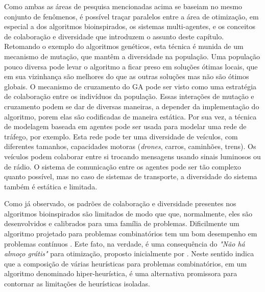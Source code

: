 Como ambas as áreas de pesquisa mencionadas acima se baseiam no mesmo conjunto de fenômenos, é possível traçar paralelos entre a área de otimização, em especial a dos algoritmos bioinspirados, os sistemas multi-agentes, e os conceitos de colaboração e diversidade que introduzem o assunto deste capítulo. Retomando o exemplo do algoritmos genéticos, esta técnica é munida de um mecanismo de mutação, que mantêm a diversidade na população. Uma população pouco diversa pode levar o algoritmo a ficar preso em soluções ótimas locais, que em sua vizinhança são melhores do que as outras soluções mas não são ótimos globais. O mecanismo de cruzamento do GA pode ser visto como uma estratégia de colaboração entre os indivíduos da população. Essas interações de mutação e cruzamento podem se dar de diversas maneiras, a depender da implementação do algoritmo, porem elas são codificadas de maneira estática. Por sua vez, a técnica de modelagem baseada em agentes pode ser usada para modelar uma rede de tráfego, por exemplo. Esta rede pode ter uma diversidade de veículos, com diferentes tamanhos, capacidades motoras (\textit{drones}, carros, caminhões, trens). Os veículos podem colaborar entre si trocando mensagens usando sinais luminosos ou de rádio. O sistema de comunicação entre os agentes pode ser tão complexo quanto possível, mas no caso de sistemas de transporte, a diversidade do sistema também é estática e limitada.

Como já observado, os padrões de colaboração e diversidade presentes nos algoritmos bioinspirados são limitados de modo que que, normalmente, eles são desenvolvidos e calibrados para uma família de problemas. Dificilmente um algoritmo projetado para problemas combinatórios tem um bom desempenho em problemas contínuos \cite{burke2003}. Este fato, na verdade, é uma consequência do \textit{"Não há almoço grátis"} para otimização, proposto inicialmente por . Neste sentido  indica que a composição de várias heurísticas para problemas combinatórios, em um algoritmo denominado hiper-heurística, é uma alternativa promissora para contornar as limitações de heurísticas isoladas. 

